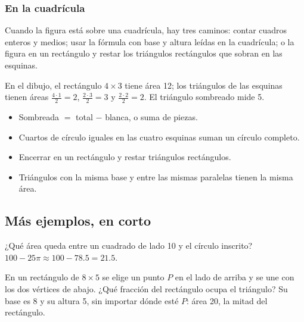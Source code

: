
\subsubsection{En la cuadrícula}
Cuando la figura está sobre una cuadrícula, hay tres caminos: contar cuadros enteros y medios; usar la fórmula con base
y altura leídas en la cuadrícula; o  la figura en un rectángulo y restar los triángulos rectángulos que
sobran en las esquinas.


En el dibujo, el rectángulo $4 \times 3$ tiene área 12; los triángulos de las esquinas tienen áreas
$\tfrac{4 \cdot 1}{2} = 2$, $\tfrac{2 \cdot 3}{2} = 3$ y $\tfrac{2 \cdot 2}{2} = 2$. El triángulo sombreado mide 5.

\begin{regla}
\begin{itemize}
  \item Sombreada $=$ total $-$ blanca, o suma de piezas.
  \item Cuartos de círculo iguales en las cuatro esquinas suman un círculo completo.
  \item Encerrar en un rectángulo y restar triángulos rectángulos.
  \item Triángulos con la misma base y entre las mismas paralelas tienen la misma área.
\end{itemize}
\end{regla}

\subsection{Más ejemplos, en corto}
\begin{ejemplo}
¿Qué área queda entre un cuadrado de lado 10 y el círculo inscrito?
\solucion $100 - 25\pi \approx 100 - 78.5 = 21.5$.
\end{ejemplo}

\begin{ejemplo}
En un rectángulo de $8 \times 5$ se elige un punto $P$ en el lado de arriba y se une con los dos vértices de abajo. ¿Qué
fracción del rectángulo ocupa el triángulo?
\solucion Su base es 8 y su altura 5, sin importar dónde esté $P$: área 20, la mitad del rectángulo.
\end{ejemplo}

